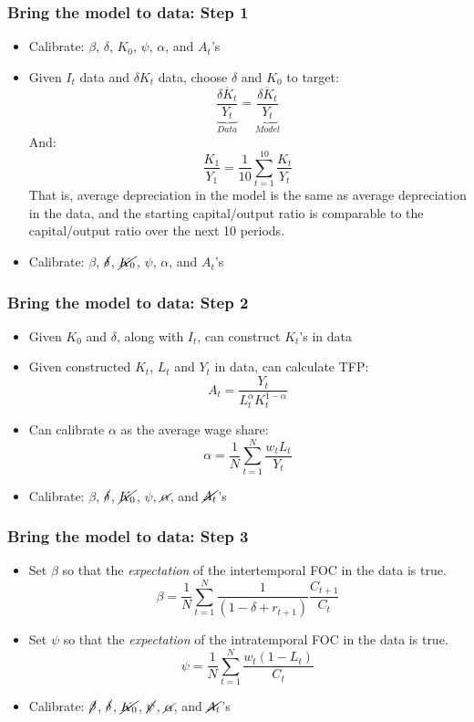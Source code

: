 \documentclass{beamer}
\begin{document}
\begin{frame}
\frametitle[alignment=center]{Bring the model to data: Step 1}
\begin{itemize}
\item Calibrate: $\beta$, $\delta$, $K_0$, $\psi$, $\alpha$, and $A_t$'s
\item Given $I_t$ data and $\delta K_t$ data, choose $\delta$ and $K_0$ to target:
$$\underbrace{\overline{\frac{\delta K_t}{Y_t}}}_{Data}=\underbrace{\overline{\frac{\delta K_t}{Y_t}}}_{Model}$$
And:
$$\frac{ K_1}{Y_1}=\frac{1}{10}\sum_{t=1}^{10}\frac{K_t}{Y_t}$$
That is, average depreciation in the model is the same as average depreciation in the data, and the starting capital/output ratio is comparable to the capital/output ratio over the next 10 periods.
\item Calibrate: $\beta$, $\cancel{\delta}$, $\cancel{K_0}$, $\psi$, $\alpha$, and $A_t$'s
\end{itemize}
\end{frame}

\begin{frame}
\frametitle[alignment=center]{Bring the model to data: Step 2}
\begin{itemize}
\item Given $K_0$ and $\delta$, along with $I_t$, can construct $K_t$'s in data
\item Given constructed $K_t$, $L_t$ and $Y_t$ in data, can calculate TFP:
$$A_t=\frac{Y_t}{L_t^\alpha K_t^{1-\alpha}}$$ 
\item Can calibrate $\alpha$ as the average wage share:
$$\alpha = \frac{1}{N}\sum_{t=1}^N\frac{w_tL_t}{Y_t}$$
\item Calibrate: $\beta$, $\cancel{\delta}$, $\cancel{K_0}$, $\psi$, $\cancel{\alpha}$, and $\cancel{A_t}$'s
\end{itemize}
\end{frame}

\begin{frame}
\frametitle[alignment=center]{Bring the model to data: Step 3}
\begin{itemize}
\item Set $\beta$ so that the \emph{expectation} of the intertemporal FOC in the data is true.
$$\beta=\frac{1}{N}\sum_{t=1}^N\frac{1}{(1-\delta+r_{t+1})}\frac{C_{t+1}}{C_t}$$
\item Set $\psi$ so that the \emph{expectation} of the intratemporal FOC in the data is true.
$$\psi = \frac{1}{N}\sum_{t=1}^N\frac{w_t(1-L_t)}{C_t} $$
\item Calibrate: $\cancel{\beta}$, $\cancel{\delta}$, $\cancel{K_0}$, $\cancel{\psi}$, $\cancel{\alpha}$, and $\cancel{A_t}$'s
\end{itemize}
\end{frame}
\end{document}
